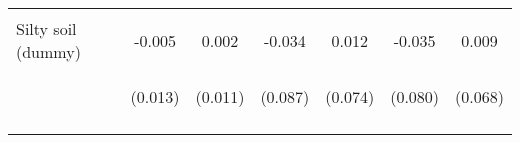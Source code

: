 \begin{center}
\begin{tabular}{lcccccc}
\vspace{4pt} & \begin{footnotesize}[0.422]\end{footnotesize} & \begin{footnotesize}[0.354]\end{footnotesize} & \begin{footnotesize}[0.324]\end{footnotesize} & \begin{footnotesize}[0.310]\end{footnotesize} & \begin{footnotesize}[0.320]\end{footnotesize} & \begin{footnotesize}[0.305]\end{footnotesize} \\
Silty soil (dummy) & -0.005 & 0.002 & -0.034 & 0.012 & -0.035 & 0.009 \\
 & \begin{footnotesize}(0.013)\end{footnotesize} & \begin{footnotesize}(0.011)\end{footnotesize} & \begin{footnotesize}(0.087)\end{footnotesize} & \begin{footnotesize}(0.074)\end{footnotesize} & \begin{footnotesize}(0.080)\end{footnotesize} & \begin{footnotesize}(0.068)\end{footnotesize} \\
\vspace{4pt} & \begin{footnotesize}[0.723]\end{footnotesize} & \begin{footnotesize}[0.882]\end{footnotesize} & \begin{footnotesize}[0.696]\end{footnotesize} & \begin{footnotesize}[0.872]\end{footnotesize} & \begin{footnotesize}[0.665]\end{footnotesize} & \begin{footnotesize}[0.894]\end{footnotesize} \\

\end{tabular}
\end{center}
